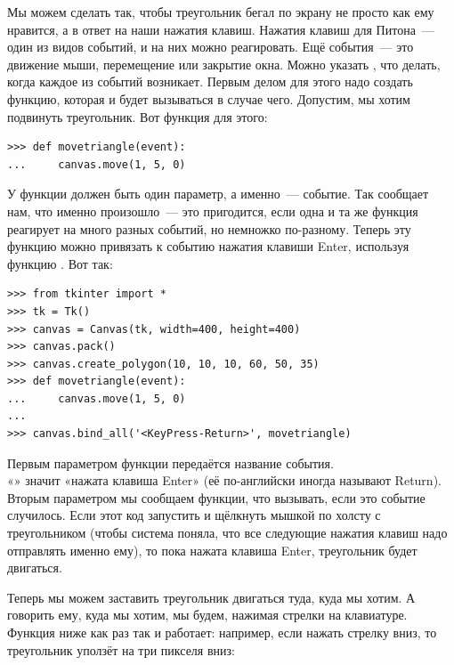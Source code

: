 Мы можем сделать так, чтобы треугольник бегал по экрану не просто как ему нравится, а в ответ на наши нажатия клавиш. Нажатия клавиш для Питона — один из видов событий, и на них можно реагировать. Ещё события — это движение мыши, перемещение или закрытие окна. Можно указать , что делать, когда каждое из событий возникает. Первым делом для этого надо создать функцию, которая и будет вызываться в случае чего. Допустим, мы хотим подвинуть треугольник. Вот функция для этого:

\begin{listing}
\begin{verbatim}
>>> def movetriangle(event):
...     canvas.move(1, 5, 0)
\end{verbatim}
\end{listing}

У функции должен быть один параметр, а именно — событие. Так  сообщает нам, что именно произошло — это пригодится, если одна и та же функция реагирует на много разных событий, но немножко по-разному. Теперь эту функцию можно привязать к событию нажатия клавиши Enter, используя функцию . Вот так:

\begin{listing}
\begin{verbatim}
>>> from tkinter import *
>>> tk = Tk()
>>> canvas = Canvas(tk, width=400, height=400)
>>> canvas.pack()
>>> canvas.create_polygon(10, 10, 10, 60, 50, 35)
>>> def movetriangle(event):
...     canvas.move(1, 5, 0)
...
>>> canvas.bind_all('<KeyPress-Return>', movetriangle)
\end{verbatim}
\end{listing}

Первым параметром функции  передаётся название события. \\«» значит «нажата клавиша Enter» (её по-английски иногда называют Return). Вторым параметром мы сообщаем функции, что вызывать, если это событие случилось. Если этот код запустить и щёлкнуть мышкой по холсту с треугольником (чтобы система поняла, что все следующие нажатия клавиш надо отправлять именно ему), то пока нажата клавиша Enter, треугольник будет двигаться.

Теперь мы можем заставить треугольник двигаться туда, куда мы хотим. А говорить ему, куда мы хотим, мы будем, нажимая стрелки на клавиатуре. Функция ниже как раз так и работает: например, если нажать стрелку вниз, то треугольник уползёт на три пикселя вниз:

